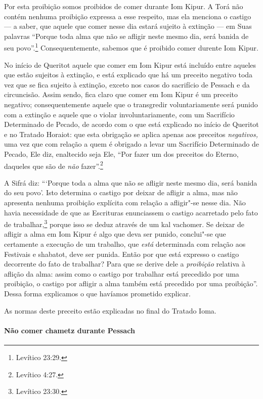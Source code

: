 \begin{multicols}{2}
Por esta proibição somos proibidos de comer durante Iom Kipur\starr. A
Torá\starr{} não contém nenhuma proibição expressa a esse respeito, mas ela
menciona o castigo --- a saber, que aquele que comer nesse dia estará
sujeito à extinção --- em Suas palavras ``Porque toda alma que não se
afligir neste mesmo dia, será banida de seu povo''.\footnote{Levítico 23:29.}
Consequentemente, sabemos que é proibido comer durente Iom Kipur\starr.

No início de Queritot\starr{} aquele que comer em Iom Kipur\starr{} está incluído
entre aqueles que estão sujeitos à extinção, e está explicado que há
um preceito negativo toda vez que se fica sujeito à extinção, exceto nos
casos do sacrifício de Pessach\starr{} e da circuncisão. Assim sendo, fica
claro que comer em Iom Kipur\starr{} é um preceito negativo; consequentemente aquele que o
transgredir voluntariamente será punido com a extinção e aquele que o violar
involuntariamente, com um Sacrifício Determinado de Pecado, de acordo
com o que está explicado no início de Queritot\starr{} e no Tratado Horaiot\starr: que
esta obrigação se aplica apenas aos preceitos \emph{negativos,} uma vez
que com relação a quem é obrigado a levar um Sacrifício Determinado de
Pecado, Ele diz, enaltecido seja Ele, ``Por fazer um dos preceitos do
Eterno, daqueles que são de \emph{não} fazer''.\footnote{Levítico 4:27.}

A Sifrá\starr{} diz: ```Porque toda a alma que não se afligir neste mesmo dia,
será banida do seu povo'. Isto determina o castigo por deixar de afligir
a alma, mas não apresenta nenhuma proibição explícita com relação a afligir"-se
nesse dia. Não havia necessidade de que as Escrituras enunciassem o castigo
acarretado pelo fato de trabalhar,\footnote{Levítico 23:30.} porque isso se
deduz através de um kal vachomer\starr. Se deixar de
afligir a alma em Iom Kipur\starr{} é algo que deva ser punido, conclui"-se que
certamente a execução de um trabalho, que \emph{está} determinada com
relação aos Festivais e shabatot\starr, deve ser punida. Então por que está
expresso o castigo decorrente do fato de trabalhar? Para que se derive
dele a \emph{proibição} relativa à aflição da alma: assim como o castigo por
trabalhar está precedido por uma proibição, o castigo por afligir a alma
também está precedido por uma proibição''. Dessa forma explicamos o que havíamos prometido explicar.

As normas deste preceito estão explicadas no final do Tratado Ioma\starr.

\paragraph{Não comer chametz\starr{} durante Pessach\starr{}}


\end{multicols}
